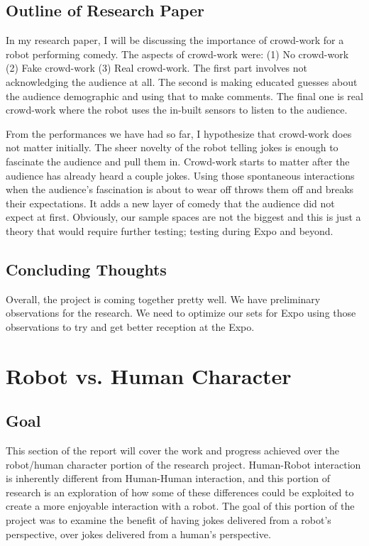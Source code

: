 \documentclass[onecolumn, draftclsnofoot,10pt, compsoc]{IEEEtran}
\begin{document}
\subsection{Outline of Research Paper}
In my research paper, I will be discussing the importance of crowd-work for a robot performing comedy. The aspects of crowd-work were: (1) No crowd-work (2) Fake crowd-work (3) Real crowd-work. The first part involves not acknowledging the audience at all. The second is making educated guesses about the audience demographic and using that to make comments. The final one is real crowd-work where the robot uses the in-built sensors to listen to the audience.

From the performances we have had so far, I hypothesize that crowd-work does not matter initially. The sheer novelty of the robot telling jokes is enough to fascinate the audience and pull them in. Crowd-work starts to matter after the audience has already heard a couple jokes. Using those spontaneous interactions when the audience's fascination is about to wear off throws them off and breaks their expectations. It adds a new layer of comedy that the audience did not expect at first. Obviously, our sample spaces are not the biggest and this is just a theory that would require further testing; testing during Expo and beyond.

\subsection{Concluding Thoughts}
Overall, the project is coming together pretty well. We have preliminary observations for the research. We need to optimize our sets for Expo using those observations to try and get better reception at the Expo.




\section{Robot vs. Human Character}
\subsection{Goal}
This section of the report will cover the work and progress achieved over the robot/human character portion of the research project. Human-Robot interaction is inherently different from Human-Human interaction, and this portion of research is an exploration of how some of these differences could be exploited to create a more enjoyable interaction with a robot. The goal of this portion of the project was to examine the benefit of having jokes delivered from a robot's perspective, over jokes delivered from a human's perspective.
\end{document}

